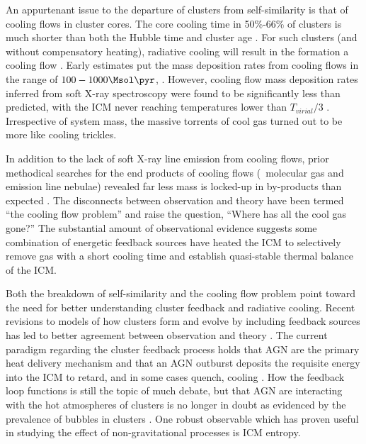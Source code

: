 \documentclass[apj]{emulateapj}
\begin{document}
An appurtenant issue to the departure of clusters from self-similarity
is that of cooling flows in cluster cores. The core cooling time in
50\%-66\% of clusters is much shorter than both the Hubble time and
cluster age \citep{1984ApJ...285....1S, 1992MNRAS.258..177E, white97,
1998MNRAS.298..416P, 2005MNRAS.359.1481B}. For such clusters (and
without compensatory heating), radiative cooling will result in the
formation a cooling flow \citep[see][for a
review]{fabiancfreview}. Early estimates put the mass deposition
rates from cooling flows in the range of $100-1000 \Msol \pyr$,
\citep[\eg][]{1984ApJ...276...38J}. However, cooling flow mass
deposition rates inferred from soft X-ray spectroscopy were found to
be significantly less than predicted, with the ICM never reaching
temperatures lower than $T_{virial}/3$ \citep{tamura01, peterson01,
peterson03, 2004A&A...413..415K}. Irrespective of system mass, the
massive torrents of cool gas turned out to be more like cooling
trickles.

In addition to the lack of soft X-ray line emission from cooling
flows, prior methodical searches for the end products of cooling flows
(\ie\ molecular gas and emission line nebulae) revealed far less mass
is locked-up in by-products than expected \citep{heckman89,
mcnamara90, odea94, voit95}. The disconnects between observation and
theory have been termed ``the cooling flow problem'' and raise the
question, ``Where has all the cool gas gone?'' The substantial amount
of observational evidence suggests some combination of energetic
feedback sources have heated the ICM to selectively remove gas with a
short cooling time and establish quasi-stable thermal balance of the
ICM.

Both the breakdown of self-similarity and the cooling flow problem
point toward the need for better understanding cluster feedback and
radiative cooling. Recent revisions to models of how clusters form and
evolve by including feedback sources has led to better agreement
between observation and theory \citep{bower06, croton06, saro06}. The
current paradigm regarding the cluster feedback process holds that AGN
are the primary heat delivery mechanism and that an AGN outburst
deposits the requisite energy into the ICM to retard, and in some
cases quench, cooling \citep[see][for a review]{mcnamrev}. How the
feedback loop functions is still the topic of much debate, but that
AGN are interacting with the hot atmospheres of clusters is no longer
in doubt as evidenced by the prevalence of bubbles in clusters
\citep{birzan04}. One robust observable which has proven useful in
studying the effect of non-gravitational processes is ICM entropy.
\end{document}
